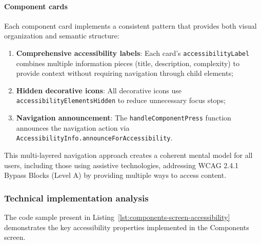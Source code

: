 \FloatBarrier

\paragraph{Component cards}

Each component card implements a consistent pattern that provides both visual organization and semantic structure:

\begin{enumerate}
    \item \textbf{Comprehensive accessibility labels}: Each card's \texttt{accessibilityLabel} combines multiple information pieces (title, description, complexity) to provide context without requiring navigation through child elements;
    
    \item \textbf{Hidden decorative icons}: All decorative icons use \texttt{accessibilityElementsHidden} to reduce unnecessary focus stops;
    
    \item \textbf{Navigation announcement}: The \texttt{handleComponentPress} function announces the navigation action via \texttt{AccessibilityInfo.announceForAccessibility}.
\end{enumerate}

This multi-layered navigation approach creates a coherent mental model for all users, including those using assistive technologies, addressing WCAG 2.4.1 Bypass Blocks (Level A) by providing multiple ways to access content.

\FloatBarrier

\subsubsection{Technical implementation analysis}

The code sample present in Listing~\ref{lst:components-screen-accessibility} demonstrates the key accessibility properties implemented in the Components screen.

